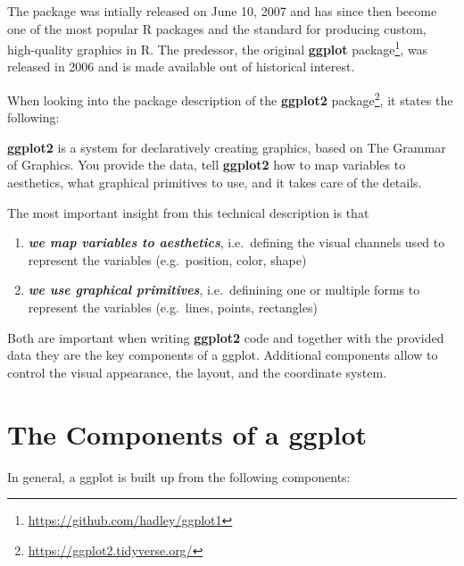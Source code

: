 \documentclass[
]{krantz}
\providecommand{\tightlist}{%
  \setlength{\itemsep}{0pt}\setlength{\parskip}{0pt}}
\renewenvironment{quote}{\begin{VF}}{\end{VF}}
\renewcommand{\href}[2]{#2\footnote{\url{#1}}}
\begin{document}
The package was intially released on June 10, 2007 and has since then become one of the most popular R packages and the standard for producing custom, high-quality graphics in R. The predessor, the original \href{https://github.com/hadley/ggplot1}{\textbf{ggplot} package}, was released in 2006 and is made available out of historical interest.

When looking into the package description of the \href{https://ggplot2.tidyverse.org/}{\textbf{ggplot2} package}, it states the following:

\begin{quote}
\textbf{ggplot2} is a system for declaratively creating graphics, based on The Grammar of Graphics. You provide the data, tell \textbf{ggplot2} how to map variables to aesthetics, what graphical primitives to use, and it takes care of the details.
\end{quote}

The most important insight from this technical description is that

\begin{enumerate}
\def\labelenumi{\arabic{enumi}.}
\tightlist
\item
  \textbf{\emph{we map variables to aesthetics}}, i.e.~defining the visual channels used to represent the variables (e.g.~position, color, shape)
\item
  \textbf{\emph{we use graphical primitives}}, i.e.~definining one or multiple forms to represent the variables (e.g.~lines, points, rectangles)
\end{enumerate}

Both are important when writing \textbf{ggplot2} code and together with the provided data they are the key components of a ggplot. Additional components allow to control the visual appearance, the layout, and the coordinate system.

\hypertarget{components}{%
\section{The Components of a ggplot}\label{components}}

In general, a ggplot is built up from the following components:
\end{document}
